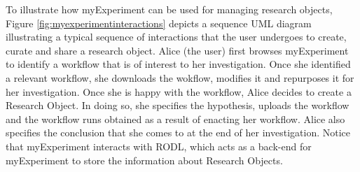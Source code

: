 To illustrate how myExperiment can be used for managing research objects, Figure \ref{fig:myexperimentinteractions} depicts a sequence UML diagram illustrating a typical sequence of interactions that the user undergoes to create, curate and share a research object. Alice (the user) first browses myExperiment to identify a workflow that is of interest to her investigation. Once she identified a relevant workflow, she downloads the wokflow, modifies it and repurposes it for her investigation. Once she is happy with the workflow, Alice decides to create a Research Object. In doing so, she specifies the hypothesis, uploads the workflow and the workflow runs obtained as a result of enacting her workflow. Alice also specifies the conclusion that she comes to at the end of her investigation. Notice that myExperiment interacts with RODL, which acts as a back-end for myExperiment to store the information about Research Objects.


